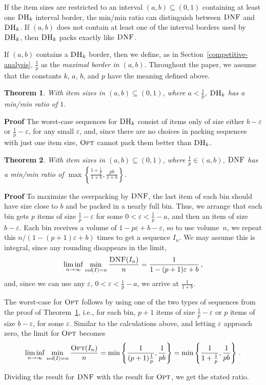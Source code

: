 \documentclass[11pt]{article}
\newtheorem{xtheorem}{Theorem}
\newenvironment{theorem}{\begin{xtheorem}\rm}{\end{xtheorem}}
\newenvironment{proof}{\begin{trivlist}\item[]{\bf Proof }}{\hspace*{\fill}\raisebox{-1pt}{\boldmath$\Box$}\end{trivlist}}
\newcommand{\OPT}{\ensuremath{\operatorname{\textsc{Opt}}}\xspace}
\newcommand{\DNF}{\ensuremath{\operatorname{\textsc{DNF}}}\xspace}
\newcommand{\DHk}{{\ensuremath{\textsc{DH}_k}}\xspace}
\newcommand{\SET}[1]{\left\{#1\right\}}
\newcommand{\vol}[1]{\ensuremath{\textit{vol}(#1)}\xspace}
\newcommand{\p}{p}
\newcommand{\eps}{\ensuremath{\varepsilon}\xspace}
\begin{document}
If the item sizes are restricted to an interval 
$(a,b)\subseteq (0,1)$ containing at least one \DHk interval border,
the min/min ratio can distinguish between \DNF and \DHk.
If $(a,b)$ does not contain at least one of the interval borders
used by \DHk, then \DHk packs exactly like \DNF.

If $(a,b)$ contains a \DHk border, then we define, as in Section~\ref{competitive-analysis}, 
$\frac{1}{\p}$ as the {\em maximal border in $(a,b)$}.
Throughout the paper, we assume that the constants $k$, $a$, $b$, and $p$
have the meaning defined above.

\begin{theorem}
\label{theorem-max-max-DHk}
With item sizes in $(a,b)\subseteq (0,1)$, where $a < \frac{1}{\p}$,
\DHk has a min/min ratio of $1$.
\end{theorem}
\begin{proof}
The worst-case sequences for \DHk consist of items only of size either $b-\varepsilon$ or $\frac{1}{\p}-\varepsilon$,
for any small $\varepsilon$, and, since there are no choices in packing
sequences with just one item size, \OPT cannot pack them better than \DHk.
\end{proof}

\begin{theorem}
\label{max-dnf}
With item sizes in $(a,b)\subseteq (0,1)$, where $\frac{1}{\p}\in (a,b)$,
\DNF has a min/min ratio of
$\max\SET{\frac{1+\frac{1}{\p}}{1+b},\frac{\p b}{1+b}}$.
\end{theorem}
\begin{proof}
To maximize the overpacking by \DNF, the last item of each bin
should have size close to $b$ and be packed in a nearly full bin.
Thus, we arrange that each bin gets $\p$ items of size $\frac{1}{\p}-\varepsilon$
for some $0 < \varepsilon < \frac{1}{\p}-a$, and then an item of size
$b-\eps$.
Each bin receives a volume of $1-\p\varepsilon+b-\eps$, so to use volume~$n$,
we repeat this $n/(1-(\p+1)\varepsilon+b)$ times to get a sequence $I_n$.
We may assume this is integral, since any rounding disappears in the limit,
$$\liminf\limits_{n\rightarrow\infty}\min\limits_{\vol{I} = n} \frac{\DNF(I_n)}{n}
=\frac{1}{1-(\p+1)\varepsilon+b}\,,$$ and, since we can use any
$\varepsilon$, $0 < \varepsilon < \frac{1}{\p}-a$,
we arrive at $\frac{1}{1+b}$.

The worst-case for \OPT follows by using one of the two types of sequences
from the proof of Theorem~\ref{theorem-max-max-DHk},
i.e., for each bin, $\p +1$ items of size $\frac{1}{\p}-\varepsilon$
or $\p$ items of size $b-\varepsilon$, for some $\varepsilon$.
Similar to the calculations above, and letting $\varepsilon$ approach zero,
the limit for \OPT becomes
$$\liminf\limits_{n\rightarrow\infty}\min\limits_{\vol{I} = n} \frac{\OPT(I_n)}{n} = \min\SET{\frac{1}{(\p+1)\frac{1}{\p}},\frac{1}{\p b}}
=\min\SET{\frac{1}{1+\frac{1}{\p}},\frac{1}{\p b}}\,.$$

Dividing the result for \DNF with the result for \OPT,
we get the stated ratio.
\end{proof}
\end{document}
